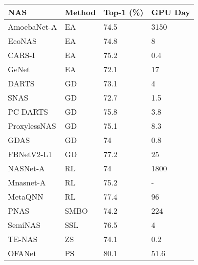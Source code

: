 \documentclass{article}
\providecommand{\citep}{\cite}
\begin{document}
\begin{table}[!]
 \begin{center}
   \begin{tabular}{@{}llll@{}}
     \toprule
     NAS    & Method  & Top-1 (\%) & GPU Day \\ \midrule
     AmoebaNet-A \citep{realRegularizedEvolutionImage2019}    & EA            & 74.5       & 3150     \\
     EcoNAS \citep{zhouEcoNASFindingProxies2020}         & EA            & 74.8       & 8       \\
     CARS-I \citep{yangCARSContinuousEvolution2020}         & EA            & 75.2       & 0.4     \\
     GeNet \citep{xieGeneticCNN2017}          & EA            & 72.1       & 17      \\
     DARTS \citep{liuDARTSDifferentiableArchitecture2019}          & GD            & 73.1       & 4       \\
     SNAS \citep{xieSNASStochasticNeural2018}           & GD            & 72.7       & 1.5     \\
     PC-DARTS \citep{xuPCDARTSPartialChannel2019}       & GD            & 75.8       & 3.8     \\
     ProxylessNAS \citep{cai_proxylessnas:_2019}   & GD            & 75.1       & 8.3     \\
     GDAS \citep{zhangOvercomingMultiModelForgetting2020}           & GD            & 74         & 0.8     \\
     FBNetV2-L1 \citep{wanFBNetV2DifferentiableNeural2020}     & GD            & 77.2       & 25      \\
     NASNet-A \citep{zophLearningTransferableArchitectures2018}       & RL            & 74         & 1800    \\
     Mnasnet-A \citep{tan_mnasnet:_2019}      & RL            & 75.2       & -       \\
     MetaQNN \citep{bakerDesigningNeuralNetwork2017}            & RL            & 77.4       & 96      \\
     PNAS \citep{liuProgressiveNeuralArchitecture2018}           & SMBO          & 74.2       & 224     \\
     SemiNAS \citep{luoSemiSupervisedNeuralArchitecture2020} & SSL & 76.5 & 4 \\
     TE-NAS \cite{chen2021neural} & ZS & 74.1 & 0.2 \\
     OFANet \citep{caiOnceforAllTrainOne2020}         & PS            & 80.1       & 51.6    \\

\end{tabular}
\end{center}
\end{table}
\end{document}
